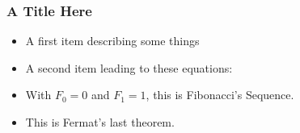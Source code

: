 \documentclass[t]{beamer}
\begin{document}
    \begin{frame}\frametitle{A Title Here}
        \begin{itemize}
            \item<1> A first item describing some things
            \item<2-4> A second item leading to these equations:
        \item<3-> With $F_0=0$ and $F_1=1$, this is Fibonacci's Sequence.
        \item<4-> This is Fermat's last theorem.
        \end{itemize}   
    \end{frame} 
\end{document}
